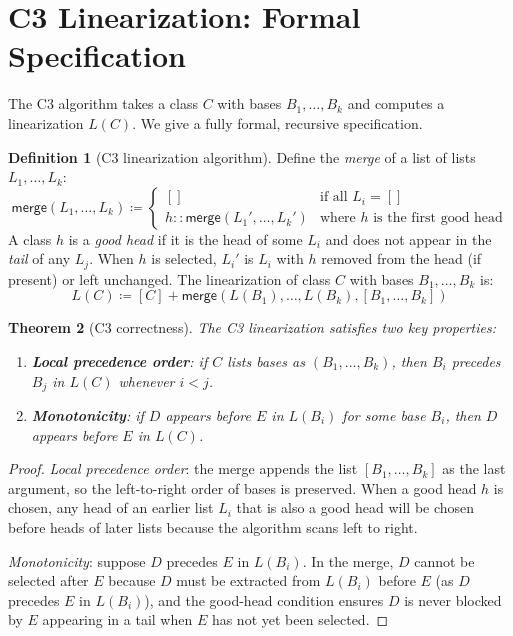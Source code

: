 \documentclass[11pt,a4paper]{report}
\theoremstyle{definition}
\newtheorem{definition}{Definition}[chapter]
\theoremstyle{plain}
\newtheorem{theorem}[definition]{Theorem}
\newcommand{\defeq}{\coloneqq}
\begin{document}
\section{C3 Linearization: Formal Specification}

The C3 algorithm takes a class $C$ with bases $B_1, \ldots, B_k$ and computes
a linearization $L(C)$.  We give a fully formal, recursive specification.

\begin{definition}[C3 linearization algorithm]
\label{def:c3-algorithm}
Define the \emph{merge} of a list of lists $L_1, \ldots, L_k$:
\[
  \mathsf{merge}(L_1, \ldots, L_k) \defeq
  \begin{cases}
    [] & \text{if all } L_i = [] \\
    h :: \mathsf{merge}(L_1', \ldots, L_k') &
      \text{where } h \text{ is the first good head}
  \end{cases}
\]
A class $h$ is a \emph{good head} if it is the head of some $L_i$ and does not
appear in the \emph{tail} of any $L_j$.  When $h$ is selected, $L_i'$ is $L_i$
with $h$ removed from the head (if present) or left unchanged.
The linearization of class $C$ with bases $B_1, \ldots, B_k$ is:
\[
  L(C) \defeq [C] + \mathsf{merge}(L(B_1), \ldots, L(B_k), [B_1, \ldots, B_k])
\]
\end{definition}

\begin{theorem}[C3 correctness]
\label{thm:c3-correct}
The C3 linearization satisfies two key properties:
\begin{enumerate}
  \item \textbf{Local precedence order}: if $C$ lists bases as
    $(B_1, \ldots, B_k)$, then $B_i$ precedes $B_j$ in $L(C)$ whenever
    $i < j$.
  \item \textbf{Monotonicity}: if $D$ appears before $E$ in $L(B_i)$
    for some base $B_i$, then $D$ appears before $E$ in $L(C)$.
\end{enumerate}
\end{theorem}
\begin{proof}
\emph{Local precedence order}: the merge appends the list
$[B_1, \ldots, B_k]$ as the last argument, so the left-to-right order of
bases is preserved.  When a good head $h$ is chosen, any head of an earlier
list $L_i$ that is also a good head will be chosen before heads of later lists
because the algorithm scans left to right.

\emph{Monotonicity}: suppose $D$ precedes $E$ in $L(B_i)$.  In the merge, $D$
cannot be selected after $E$ because $D$ must be extracted from $L(B_i)$ before
$E$ (as $D$ precedes $E$ in $L(B_i)$), and the good-head condition ensures $D$
is never blocked by $E$ appearing in a tail when $E$ has not yet been selected.
\end{proof}
\end{document}
